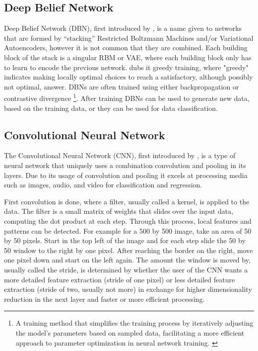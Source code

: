 \documentclass[conference]{IEEEtran}
\begin{document}
\subsection{Deep Belief Network} \label{DBN}
Deep Belief Network (DBN), first introduced by \cite{bengio2006greedy}, is a name given to networks that are formed by ``stacking'' Restricted Boltzmann Machines and/or Variational Autoencoders, however it is not common that they are combined. Each building block of the stack is a singular RBM or VAE, where each building block only has to learn to encode the previous network. \cite{bengio2006greedy} dubs it greedy training, where "greedy" indicates making locally optimal choices to reach a satisfactory, although possibly not optimal, answer. DBNs are often trained using either backpropagation or contrastive divergence \footnote{A training method that simplifies the training process by iteratively adjusting the model's parameters based on sampled data, facilitating a more efficient approach to parameter optimization in neural network training. \cite{hinton2006fast}}. After training DBNs can be used to generate new data, based on the training data, or they can be used for data classification.

\subsection{Convolutional Neural Network} \label{CNN}
The Convolutional Neural Network (CNN), first introduced by \cite{lecun1998gradient}, is a type of neural network that uniquely uses a combination convolution and pooling in its layers. Due to its usage of convolution and pooling it excels at processing media such as images, audio, and video for classification and regression. 

First convolution is done, where a filter, usually called a kernel, is applied to the data. The filter is a small matrix of weights that slides over the input data, computing the dot product at each step. Through this process, local features and patterns can be detected. For example for a 500 by 500 image, take an area of 50 by 50 pixels. Start in the top left of the image and for each step slide the 50 by 50 window to the right by one pixel. After reaching the border on the right, move one pixel down and start on the left again. The amount the window is moved by, usually called the stride, is determined by whether the user of the CNN wants a more detailed feature extraction (stride of one pixel) or less detailed feature extraction (stride of two, usually not more) in exchange for higher dimensionality reduction in the next layer and faster or more efficient processing. 
\end{document}
